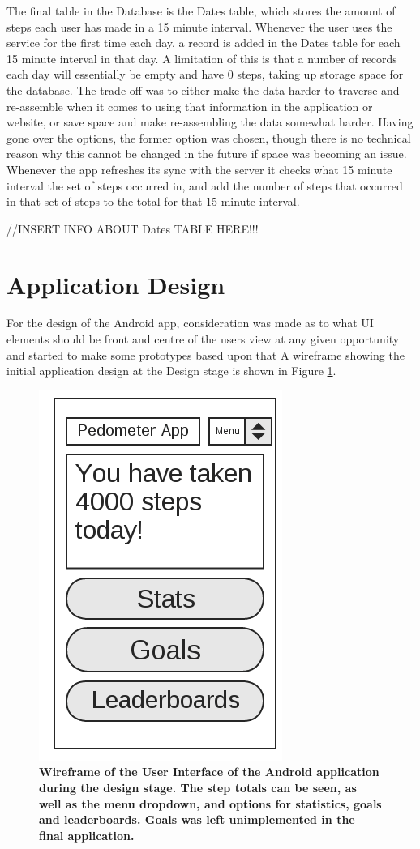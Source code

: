 \documentclass{l4proj}
\begin{document}
The final table in the Database is the Dates table, which stores the amount of steps each user has made in a 15 minute interval. Whenever the user uses the service for the first time each day, a record is added in the Dates table for each 15 minute interval in that day. A limitation of this is that a number of records each day will essentially be empty and have 0 steps, taking up storage space for the database. The trade-off was to either make the data harder to traverse and re-assemble when it comes to using that information in the application or website, or save space and make re-assembling the data somewhat harder. Having gone over the options, the former option was chosen, though there is no technical reason why this cannot be changed in the future if space was becoming an issue. Whenever the app refreshes its sync with the server it checks what 15 minute interval the set of steps occurred in, and add the number of steps that occurred in that set of steps to the total for that 15 minute interval.

//INSERT INFO ABOUT Dates TABLE HERE!!!

\section{Application Design}

For the design of the Android app, consideration was made as to what UI elements should be front and centre of the users view at any given opportunity and started to make some prototypes based upon that A wireframe showing the initial application design at the Design stage is shown in Figure \ref{design:dia1}.

\begin{figure}[H]
\centering
\includegraphics[scale=0.7]{images/diagrams/appwireframe.png}
\caption{\textbf{Wireframe of the User Interface of the Android application during the design stage. The step totals can be seen, as well as the menu dropdown, and options for statistics, goals and leaderboards. Goals was left unimplemented in the final application.}}
\label{design:dia1}
\end{figure}
\end{document}
